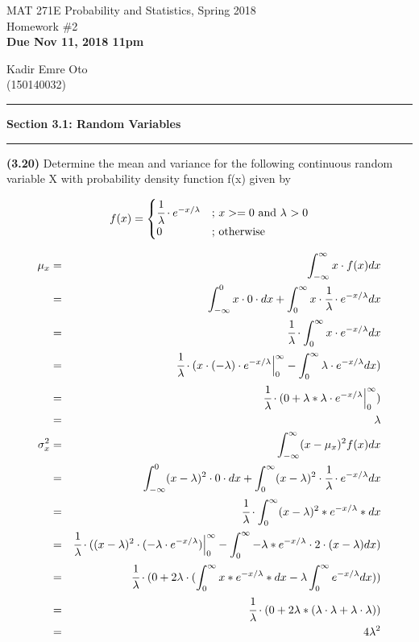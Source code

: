 \documentclass[11pt]{article}
\newcommand\question[2]{\vspace{.25in}\hrule\textbf{#1: #2}\vspace{.5em}\hrule\vspace{.10in}}
\renewcommand\part[1]{\vspace{.10in}\textbf{(#1)}}
\newcommand\header[3]{\begin{center}{#1} \\ {#2} \\ \textbf{#3} \end{center}}
\begin{document}
\raggedright

\header
	{MAT 271E Probability and Statistics, Spring 2018}
	{Homework \#2}
	{Due Nov 11, 2018 11pm}

\begin{center}
	Kadir Emre Oto \\
	(150140032)
\end{center}

\question{Section 3.1}{Random Variables}

\part{3.20} Determine the mean and variance for the following continuous random variable X with probability density function f(x) given by

\[
f(x) =
\begin{cases}
\cfrac{1}{\lambda} \cdot e^{-x/\lambda} & \text{; $x>=0$ and $\lambda$ $> 0$} \\
0 & \text{; otherwise}
\end{cases}
\]

\begin{eqnarray*}
	\mu_x &=& \int_{-\infty}^{\infty}x  \cdot f(x) dx \\
	&=&  \int_{-\infty}^{0}x \cdot 0  \cdot dx +  \int_{0}^{\infty}x  \cdot \cfrac{1}{\lambda}  \cdot e^{-x/\lambda}dx \\
	&=&  \cfrac{1}{\lambda} \cdot \int_{0}^{\infty}x \cdot e^{-x/\lambda}dx \\
	&=&  \cfrac{1}{\lambda} \cdot (x \cdot (-\lambda) \cdot e ^ {-x/\lambda}  \Big|_0^\infty - \int_{0}^{\infty}\lambda \cdot e^{-x/\lambda}dx )  \\
	&=&  \cfrac{1}{\lambda} \cdot (0 + \lambda * \lambda \cdot e ^ {-x/\lambda}  \Big|_0^\infty )  \\
	&=& \lambda \\
	\sigma_x^2 &=& \int_{-\infty}^{\infty}(x -\mu_x)^2f(x)dx \\
	&=&  \int_{-\infty}^{0}(x - \lambda)^2 \cdot 0 \cdot dx +  \int_{0}^{\infty}(x - \lambda)^2 \cdot  \cfrac{1}{\lambda} \cdot e^{-x / \lambda} dx \\
	&=&  \cfrac{1}{\lambda} \cdot \int_{0}^{\infty}(x - \lambda)^2 * e^{-x / \lambda} *dx \\
	&=&  \cfrac{1}{\lambda} \cdot ((x - \lambda)^2 \cdot (-\lambda \cdot e^{-x / \lambda})\Big|_0^\infty - \int_{0}^{\infty}-\lambda * e^{-x / \lambda} \cdot 2 \cdot (x - \lambda) dx) \\
	&=&   \cfrac{1}{\lambda} \cdot (0 + 2\lambda \cdot (\int_{0}^{\infty} x * e^{-x / \lambda} *dx - \lambda \int_{0}^{\infty} e^{-x / \lambda} dx )) \\
	&=&   \cfrac{1}{\lambda} \cdot (0 + 2\lambda * (\lambda \cdot \lambda + \lambda \cdot \lambda )) \\
	&=& 4 \lambda^2 \\
\end{eqnarray*}
\clearpage
\end{document}
